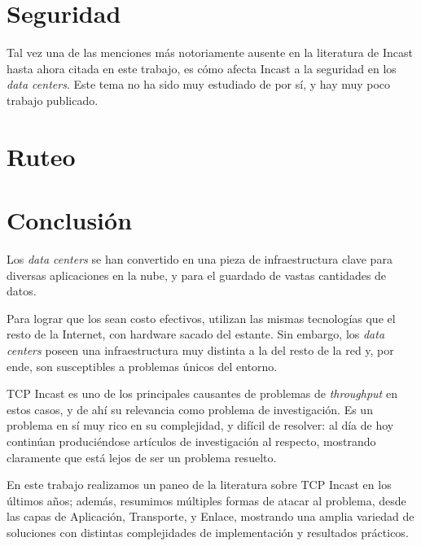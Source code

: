 \documentclass[runningheads,a4paper]{llncs}
\begin{document}

\newpage

\section{Seguridad}

Tal vez una de las menciones más notoriamente ausente en la literatura de Incast hasta ahora citada en este trabajo, es cómo afecta Incast a la seguridad en los \textit{data centers}. Este tema no ha sido muy estudiado de por sí, y hay muy poco trabajo publicado.

\citet{}

\newpage

\section{Ruteo}

\newpage

\section{Conclusión} \label{conclusion}

Los \textit{data centers} se han convertido en una pieza de infraestructura clave para diversas aplicaciones en la nube, y para el guardado de vastas cantidades de datos.

Para lograr que los sean costo efectivos, utilizan las mismas tecnologías que el resto de la Internet, con hardware sacado del estante. Sin embargo, los \textit{data centers} poseen una infraestructura muy distinta a la del resto de la red y, por ende, son susceptibles a problemas únicos del entorno.

TCP Incast es uno de los principales causantes de problemas de \textit{throughput} en estos casos, y de ahí su relevancia como problema de investigación. Es un problema en sí muy rico en su complejidad, y difícil de resolver: al día de hoy continúan produciéndose artículos de investigación al respecto, mostrando claramente que está lejos de ser un problema resuelto.

En este trabajo realizamos un paneo de la literatura sobre TCP Incast en los últimos años; además, resumimos múltiples formas de atacar al problema, desde las capas de Aplicación, Transporte, y Enlace, mostrando una amplia variedad de soluciones con distintas complejidades de implementación y resultados prácticos.
\end{document}
